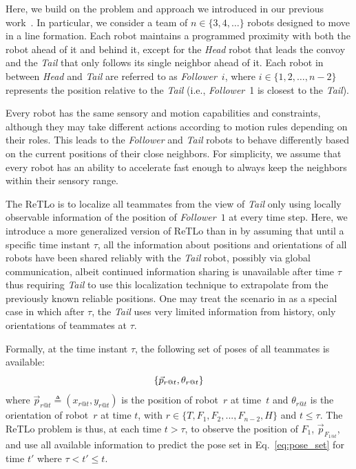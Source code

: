 \documentclass[letterpaper, 10 pt, conference]{ieeeconf}  %
\begin{document}
    Here, we build on the problem and approach we introduced in our previous
    work~\cite{CPR17}. In particular, we consider a team of $n \in
    \{3,4,\dots\}$ robots designed to move in a line formation.
    Each robot maintains a programmed
    proximity with both the robot ahead of it and behind it, except for
    the \emph{Head} robot that leads the convoy and the \emph{Tail}
    that only follows its single neighbor ahead of it. Each robot in
    between \emph{Head} and \emph{Tail} are referred to as
    \emph{Follower}~$i$, where $i \in \{1, 2, \dots, n-2\}$ represents
    the position relative to the \emph{Tail} (i.e., \emph{Follower}~1 is
    closest to the \emph{Tail}).

    Every robot has the same sensory and motion capabilities and
    constraints, although they may take different actions according to
    motion rules depending on their roles. This leads to the
    \emph{Follower} and \emph{Tail} robots to behave differently based
    on the current positions of their close neighbors. For simplicity,
    we assume that every robot has an ability to accelerate fast enough
    to always keep the neighbors within their sensory range.

    The ReTLo is to localize all teammates from the view of \emph{Tail}
    only using locally observable information of the position
    of \emph{Follower}~$1$ at every time step. Here, we introduce a 
    more generalized version of ReTLo than in \cite{CPR17} by assuming 
    that until a specific time instant $\tau$, all the information about
    positions and orientations of all robots have been shared reliably 
    with the \emph{Tail} robot, possibly via global communication, albeit
    continued information sharing is unavailable after time $\tau$ thus
    requiring \emph{Tail} to use this localization technique to extrapolate
    from the previously known reliable positions. One may treat the
    scenario in \cite{CPR17} as a special case in which after $\tau$, 
    the \emph{Tail} uses very limited information from history, only 
    orientations of teammates at $\tau$. 

    Formally, at the time instant $\tau$, the following set of poses of
    all teammates is available:
	\begin{equation}
		\{\vec{p}_{r@t},\theta_{r@t}\} \\
	    \label{eq:pose_set}
	\end{equation}
    where $\vec{p}_{r@t} \triangleq (x_{r@t}, y_{r@t})$ is the position
    of robot~$r$ at time~$t$ and $\theta_{r@t}$ is the orientation of
    robot~$r$ at time $t$, with $r \in \{T, F_{1}, F_{2}, ..., F_{n-2},
    H\}$ and $t \leq \tau$. The ReTLo problem is thus, at each time $t >
    \tau$, to observe the position of $F_1$, $\vec{p}_{F_{1@t}}$, and
    use all available information to predict the pose set in
    Eq.~\eqref{eq:pose_set} for time $t'$ where $ \tau < t' \leq t$.
\end{document}
